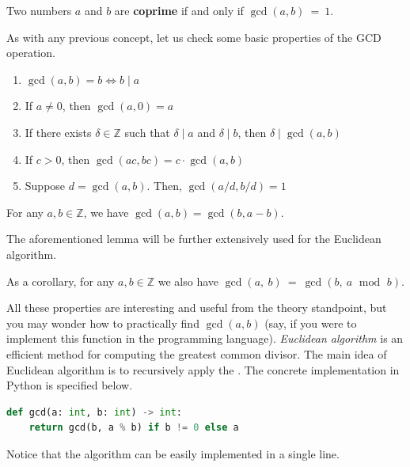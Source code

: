 \documentclass[../lecture-notes.tex]{subfiles}
\begin{document}
\begin{definition}
    Two numbers $a$ and $b$ are \textbf{coprime} if and only if $\gcd(a, b)~=~1$.
\end{definition}

As with any previous concept, let us check some basic properties of the GCD operation.

\begin{lemma} 
    \hfil
    \begin{enumerate}
        \item $\gcd(a, b) = b \iff b \mid a$
        \item If $a \neq 0$, then $\gcd(a, 0) = a$
        \item If there exists $\delta \in \mathbb{Z}$ such that $\delta \mid a$ and $\delta \mid b$, then $\delta \mid \gcd(a, b)$
        \item If $c > 0$, then $\gcd(ac, bc) = c \cdot \gcd(a, b)$
        \item Suppose $d = \gcd(a, b)$. Then, $\gcd(a/d, b/d) = 1$
    \end{enumerate}
\end{lemma}

\begin{lemma}
    For any $a,b \in \mathbb{Z}$, we have $\gcd(a, b) = \gcd(b, a - b)$. 
\end{lemma}

The aforementioned lemma will be further extensively used for the Euclidean algorithm.

\begin{corollary}\label{cor:euclidean}
    As a corollary, for any $a,b \in \mathbb{Z}$ we also have 
    $\gcd(a,~b)~=~\gcd(b,~a~\,~\text{mod}~\,~b)$.
\end{corollary}

All these properties are interesting and useful from the theory standpoint, but
you may wonder how to practically find $\gcd(a, b)$ (say, if you were to
implement this function in the programming language). \emph{Euclidean algorithm} is an
efficient method for computing the greatest common divisor. The main idea of 
Euclidean algorithm is to recursively apply the . The concrete implementation 
in Python is specified below. 
\begin{lstlisting}[language=Python, numbers=none]
def gcd(a: int, b: int) -> int:
    return gcd(b, a % b) if b != 0 else a
\end{lstlisting}

Notice that the algorithm can be easily implemented in a single line.
\end{document}
